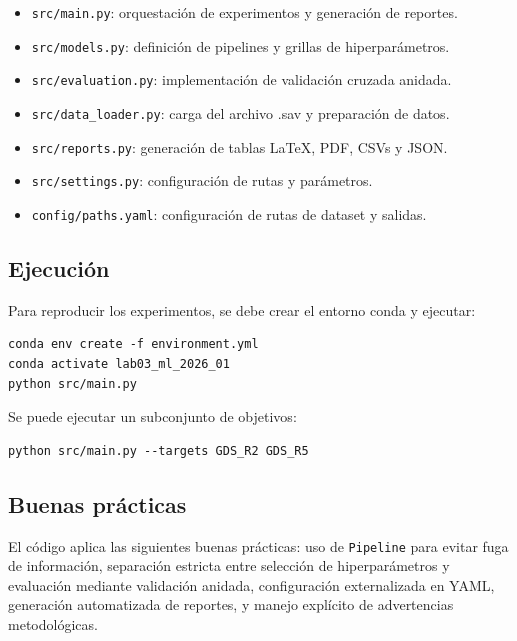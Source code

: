 \documentclass[conference]{IEEEtran}
\begin{document}
\begin{itemize}
  \item \texttt{src/main.py}: orquestación de experimentos y generación de reportes.
  \item \texttt{src/models.py}: definición de pipelines y grillas de hiperparámetros.
  \item \texttt{src/evaluation.py}: implementación de validación cruzada anidada.
  \item \texttt{src/data\_loader.py}: carga del archivo .sav y preparación de datos.
  \item \texttt{src/reports.py}: generación de tablas LaTeX, PDF, CSVs y JSON.
  \item \texttt{src/settings.py}: configuración de rutas y parámetros.
  \item \texttt{config/paths.yaml}: configuración de rutas de dataset y salidas.
\end{itemize}

\subsection{Ejecución}
Para reproducir los experimentos, se debe crear el entorno conda y ejecutar:
\begin{lstlisting}[caption={Comandos para reproducir experimentos}, label={lst:repro}]
conda env create -f environment.yml
conda activate lab03_ml_2026_01
python src/main.py
\end{lstlisting}

Se puede ejecutar un subconjunto de objetivos:
\begin{lstlisting}[caption={Ejecutar objetivos específicos}, label={lst:subset}]
python src/main.py --targets GDS_R2 GDS_R5
\end{lstlisting}

\subsection{Buenas prácticas}
El código aplica las siguientes buenas prácticas: uso de \texttt{Pipeline} para evitar fuga de información, separación estricta entre selección de hiperparámetros y evaluación mediante validación anidada, configuración externalizada en YAML, generación automatizada de reportes, y manejo explícito de advertencias metodológicas.
\end{document}
